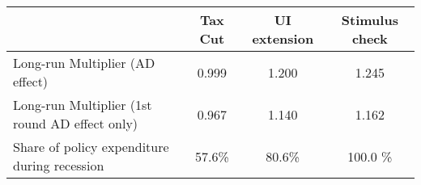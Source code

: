 \begin{tabular}{@{}lccc@{}} 
\toprule 
& Tax Cut    & UI extension    & Stimulus check    \\  \midrule 
Long-run Multiplier (AD effect) &0.999  & 1.200  & 1.245     \\ 
Long-run Multiplier (1st round AD effect only) &0.967  & 1.140  & 1.162     \\ 
Share of policy expenditure during recession &57.6\%  & 80.6\%  & 100.0 \%    \\ 
\end{tabular}  
